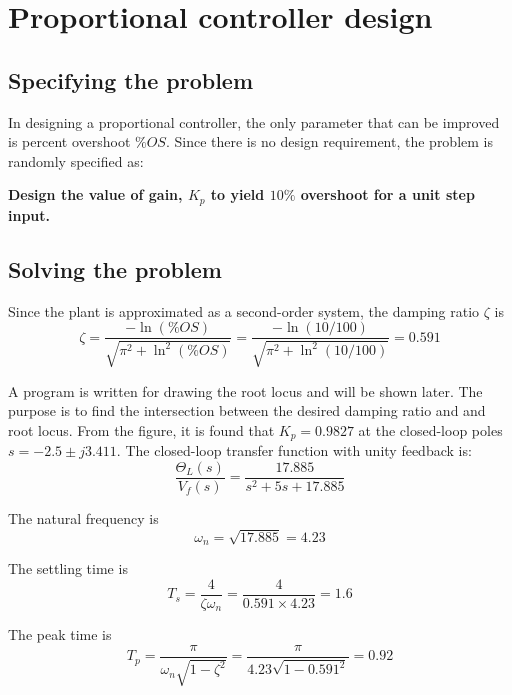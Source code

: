 \chapter{Proportional controller design}

\section{Specifying the problem}
In designing a proportional controller, the only parameter that can be improved is percent overshoot $ \% OS $. Since there is no design requirement, the problem is randomly specified as: 

\textbf{Design the value of gain, $ K_p $ to yield $ 10\% $ overshoot for a unit step input.}

\section{Solving the problem}
Since the plant is approximated as a second-order system, the damping ratio $ \zeta $ is
\begin{equation}
	\zeta = \dfrac{-\ln(\% OS)}{\sqrt{\pi^2 + \ln^2(\% OS)}} = \dfrac{-\ln(10/100)}{\sqrt{\pi^2 + \ln^2(10/100)}} = 0.591
\end{equation}

A program is written for drawing the root locus and will be shown later. The purpose is to find the intersection between the desired damping ratio and and root locus. From the figure, it is found that $ K_p = 0.9827 $ at the closed-loop poles $ s = -2.5 \pm j3.411 $. The closed-loop transfer function with unity feedback is:
\begin{equation}
		\dfrac{\Theta_L(s)}{V_f(s)} = \dfrac{17.885}{s^2 + 5s + 17.885}
\end{equation}

The natural frequency is
\begin{equation}
	\omega_n = \sqrt{17.885} = 4.23
\end{equation}

The settling time is
\begin{equation}
	T_s = \dfrac{4}{\zeta\omega_n} = \dfrac{4}{0.591\times 4.23} = 1.6
\end{equation}

The peak time is
\begin{equation}
	T_p = \dfrac{\pi}{\omega_n\sqrt{1-\zeta^2}} = \dfrac{\pi}{4.23\sqrt{1-0.591^2}} = 0.92
\end{equation}


